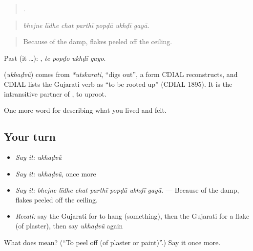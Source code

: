 \begin{quote}
      .
\end{quote}

\begin{quote}
\emph{bhejne līdhe chat parthī popḍā ukhḍī gayā.}
\end{quote}

\begin{quote}
Because of the damp, flakes peeled off the ceiling.
\end{quote}

Past (it …):    , \emph{te popḍo ukhḍī gayo}.

\begin{cousinweb}
\textbf{} (\emph{ukhaḍvũ}) comes from \emph{*utskarati}, \textquotedblleft{}digs out\textquotedblright{}, a form CDIAL reconstructs, and CDIAL lists the Gujarati verb as \textquotedblleft{}to be rooted up\textquotedblright{} (CDIAL 1895). It is the intransitive partner of \textbf{}, to uproot.
\end{cousinweb}

\begin{grammarlens}[title={What you've built}]
One more word for describing what you lived and felt.
\end{grammarlens}

\subsection*{Your turn}
\begin{itemize}
\raggedright
  \item \emph{Say it:} \emph{ukhaḍvũ}
  \item \emph{Say it:} \emph{ukhaḍvũ}, once more
  \item \emph{Say it:} \emph{bhejne līdhe chat parthī popḍā ukhḍī gayā.} — Because of the damp, flakes peeled off the ceiling.
  \item \emph{Recall:} say the Gujarati for to hang (something), then the Gujarati for a flake (of plaster), then say \emph{ukhaḍvũ} again
\end{itemize}

\begin{tcolorbox}[breakable,colback=teal!4,colframe=teal!35!black,title={Before you move on}]
What does  mean? (\textquotedblleft{}To peel off (of plaster or paint)\textquotedblright{}.) Say it once more.
\end{tcolorbox}

